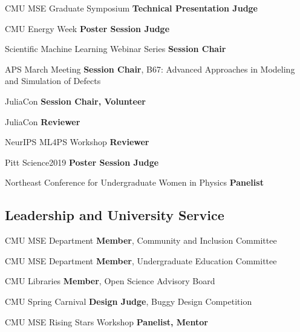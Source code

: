 {CMU MSE Graduate Symposium}
{\textbf{Technical Presentation Judge}}
{}

{CMU Energy Week}
{\textbf{Poster Session Judge}}
{}


{Scientific Machine Learning Webinar Series}
{\textbf{Session Chair}}
{}

{APS March Meeting}
{\textbf{Session Chair}, B67: Advanced Approaches in Modeling and Simulation of Defects}
{}

{JuliaCon}
{\textbf{Session Chair, Volunteer}}
{}

{JuliaCon}
{\textbf{Reviewer}}
{}

{NeurIPS ML4PS Workshop}
{\textbf{Reviewer}}
{}

{Pitt Science2019}
{\textbf{Poster Session Judge}}
{}

{Northeast Conference for Undergraduate Women in Physics}
{\textbf{Panelist}}
{}

\vspace{-2mm}
\subsection{Leadership and University Service}

                      {CMU MSE Department}
                      {\textbf{Member}, Community and Inclusion Committee}
                      {}

                      {CMU MSE Department}
                      {\textbf{Member}, Undergraduate Education Committee}
                      {}



                      {CMU Libraries}
                      {\textbf{Member}, Open Science Advisory Board}
                      {}

                      {CMU Spring Carnival}
                      {\textbf{Design Judge}, Buggy Design Competition}
                      {}
                      
                      {CMU MSE Rising Stars Workshop}
                      {\textbf{Panelist, Mentor}}
                      {}



